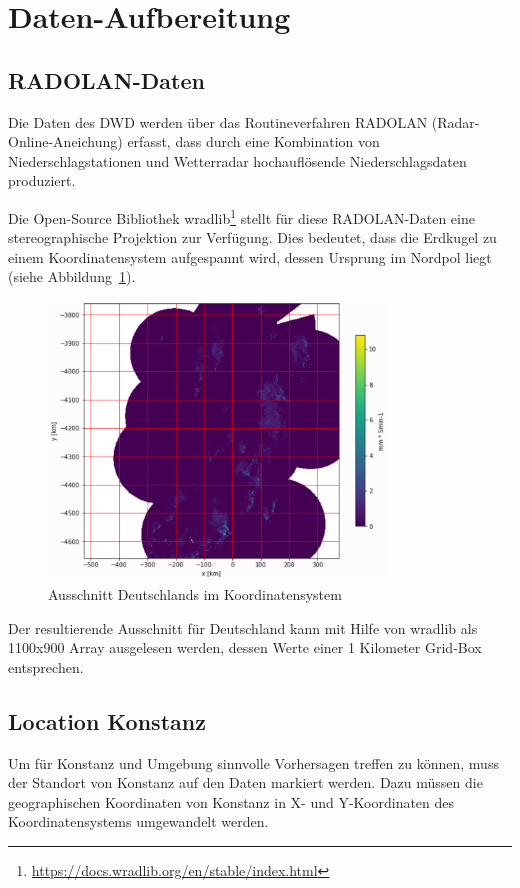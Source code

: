 \section{Daten-Aufbereitung}

\subsection{RADOLAN-Daten}
Die Daten des DWD werden über das Routineverfahren RADOLAN (Radar-Online-Aneichung) erfasst, dass durch eine Kombination von Niederschlagstationen und Wetterradar hochauflösende Niederschlagsdaten produziert. 

Die Open-Source Bibliothek wradlib\footnote{\url{https://docs.wradlib.org/en/stable/index.html}} stellt für diese RADOLAN-Daten eine stereographische Projektion zur Verfügung. Dies bedeutet, dass die Erdkugel zu einem Koordinatensystem aufgespannt wird, dessen Ursprung im Nordpol liegt (siehe Abbildung~\ref{rz}).

\begin{figure}[H]
	\centering
	\includegraphics[width=0.8\textwidth]{pics/RZ_product}
	\caption{Ausschnitt Deutschlands im Koordinatensystem}
	\label{rz}
\end{figure}

Der resultierende Ausschnitt für Deutschland kann mit Hilfe von wradlib als 1100x900 Array ausgelesen werden, dessen Werte einer 1 Kilometer Grid-Box entsprechen.

\subsection{Location Konstanz}
\label{locKN}
Um für Konstanz und Umgebung sinnvolle Vorhersagen treffen zu können, muss der Standort von Konstanz auf den Daten markiert werden. Dazu müssen die geographischen Koordinaten von Konstanz in X- und Y-Koordinaten des Koordinatensystems umgewandelt werden.

